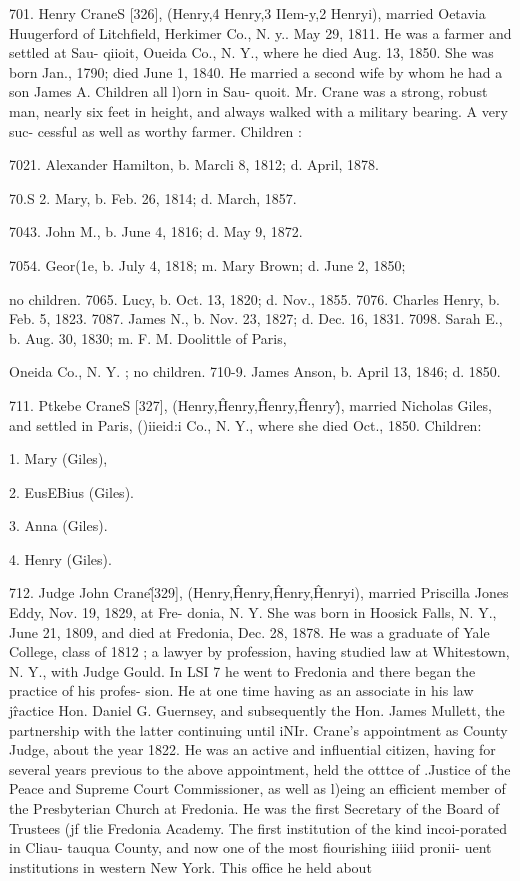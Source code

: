 701. Henry CraneS [326], (Henry,4 Henry,3 IIem-y,2 
Henryi), married Oetavia Huugerford of Litchfield, Herkimer 
Co., N. y.. May 29, 1811. He was a farmer and settled at Sau- 
qiioit, Oueida Co., N. Y., where he died Aug. 13, 1850. She 
was born Jan., 1790; died June 1, 1840. He married a second 
wife by whom he had a son James A. Children all l)orn in Sau- 
quoit. Mr. Crane was a strong, robust man, nearly six feet in 
height, and always walked with a military bearing. A very suc- 
cessful as well as worthy farmer. Children : 

7021. Alexander Hamilton, b. Marcli 8, 1812; d. April, 1878. 

70.S 2. Mary, b. Feb. 26, 1814; d. March, 1857. 

7043. John M., b. June 4, 1816; d. May 9, 1872. 

7054. Geor(1e, b. July 4, 1818; m. Mary Brown; d. June 2, 1850; 

no children. 
7065. Lucy, b. Oct. 13, 1820; d. Nov., 1855. 
7076. Charles Henry, b. Feb. 5, 1823. 
7087. James N., b. Nov. 23, 1827; d. Dec. 16, 1831. 
7098. Sarah E., b. Aug. 30, 1830; m. F. M. Doolittle of Paris, 

Oneida Co., N. Y. ; no children. 
710-9. James Anson, b. April 13, 1846; d. 1850. 

711. Ptkebe CraneS [327], (Henry,\^ Henry,\^ Henry,\^ 
Henry\^), married Nicholas Giles, and settled in Paris, ()iieid:i 
Co., N. Y., where she died Oct., 1850. Children: 

1. Mary (Giles), 

2. EusEBius (Giles). 

3. Anna (Giles). 

4. Henry (Giles). 

712. Judge John Crane\^ [329], (Henry,\^ Henry,\^ Henry,\^ 
Henryi), married Priscilla Jones Eddy, Nov. 19, 1829, at Fre- 
donia, N. Y. She was born in Hoosick Falls, N. Y., June 21, 
1809, and died at Fredonia, Dec. 28, 1878. He was a graduate 
of Yale College, class of 1812 ; a lawyer by profession, having 
studied law at Whitestown, N. Y., with Judge Gould. In LSI 7 
he went to Fredonia and there began the practice of his profes- 
sion. He at one time having as an associate in his law j\^ractice 
Hon. Daniel G. Guernsey, and subsequently the Hon. James 
Mullett, the partnership with the latter continuing until iNIr. 
Crane's appointment as County Judge, about the year 1822. He 
was an active and influential citizen, having for several years 
previous to the above appointment, held the otttce of .Justice of 
the Peace and Supreme Court Commissioner, as well as l)eing an 
efficient member of the Presbyterian Church at Fredonia. He 
was the first Secretary of the Board of Trustees (jf tlie Fredonia 
Academy. The first institution of the kind incoi-porated in Cliau- 
tauqua County, and now one of the most fiourishing iiiid pronii- 
uent institutions in western New York. This office he held about 




